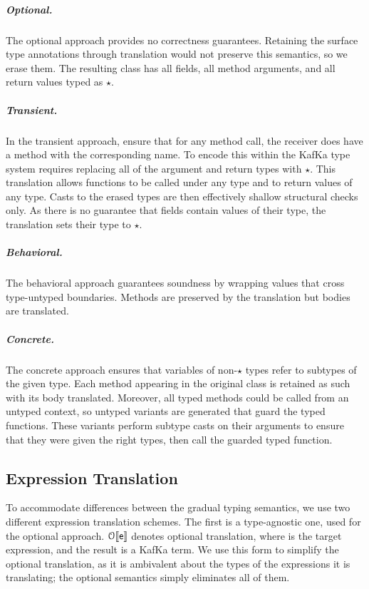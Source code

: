 \documentclass[a4paper,USenglish]{lipics-v2018}
\newcommand{\OTS}{{\mathcal{O}}}
\newcommand{\EM}[1]{\ensuremath{#1}\xspace}
\newcommand{\any}{\EM{\star}}
\newcommand{\kafka}{{\sf KafKa}\xspace}
\begin{document}
\subparagraph*{Optional.} The optional approach provides no
correctness guarantees. Retaining the surface type annotations through
translation would not preserve this semantics, so we erase them. The
resulting class has all fields, all method arguments, and all return
values typed as \any.

\subparagraph*{Transient.} In the transient approach, ensure
that for any method call, the receiver does have a method with the
corresponding name. To encode this within the \kafka type system requires
replacing all of the argument and return types with \any. This translation
allows functions to be called under any type and to return values of any
type. Casts to the erased types are then effectively shallow structural
checks only. As there is no
guarantee that fields contain values of their type,
the translation sets their type to \any.

\subparagraph*{Behavioral.} The behavioral approach guarantees
soundness by wrapping values that cross type-untyped boundaries. Methods
are preserved by the translation but bodies are translated.

\subparagraph*{Concrete.} The concrete approach ensures that
variables of non-\any types refer to subtypes of the given type. Each method
appearing in the original class is retained as such with its body
translated. Moreover, all typed methods could be called from an untyped
context, so untyped variants are generated that guard the typed functions.
These variants perform subtype casts on their arguments to ensure that they
were given the right types, then call the guarded typed function.

\subsection{Expression Translation} 

To accommodate differences between the gradual typing semantics, we use two
different expression translation schemes. The first is a type-agnostic
one, used for the optional approach. $\TR[\OTS]\e$ denotes optional translation,
where \e is the target expression, and the result is a \kafka term. We use
this form to simplify the optional translation, as it is ambivalent about the
types of the expressions it is translating; the optional semantics simply
eliminates all of them.
\end{document}
